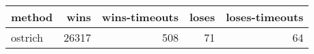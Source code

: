 \begin{tabular}{lrrrr}
\hline
 method   &   wins &   wins-timeouts &   loses &   loses-timeouts \\
\hline
 ostrich  &  26317 &             508 &      71 &               64 \\
\hline
\end{tabular}
